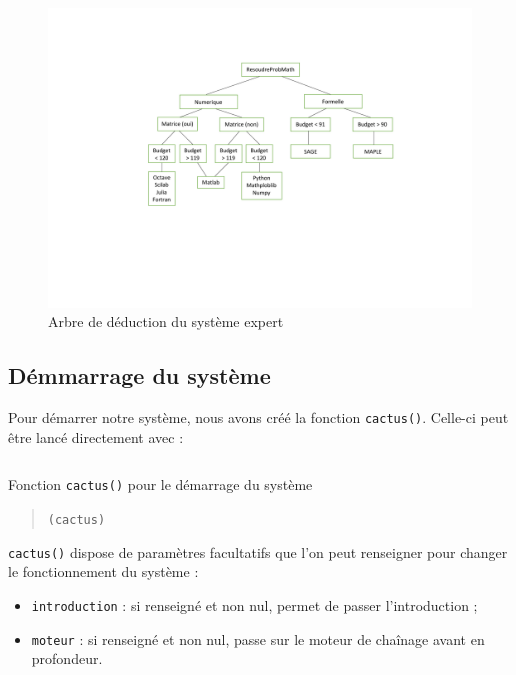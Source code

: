 \documentclass[a4paper,12pt]{article}
\begin{document}
	\begin{figure}[H]
		\centering
		\includegraphics[scale=0.5]{graph_deduction2.pdf}
		\caption{Arbre de déduction du système expert}
	\end{figure}

	\subsection{Démmarrage du système}
	
	Pour démarrer notre système, nous avons créé la fonction \texttt{cactus()}. Celle-ci peut être lancé directement avec :
	
\begin{listing}[H]
	\centering
	\inputminted[breaklines=true,linenos]{lisp}{../cactus.lisp}
	\caption{Fonction \texttt{cactus()} pour le démarrage du système}
\end{listing}

	
	\begin{quotation}
	\texttt{(cactus)}
	\end{quotation}

	\texttt{cactus()} dispose de paramètres facultatifs que l'on peut renseigner pour changer le fonctionnement du système :
	
	\begin{itemize}
		\item \texttt{introduction} : si renseigné et non nul, permet de passer l'introduction ;
		\item \texttt{moteur} : si renseigné et non nul, passe sur le moteur de chaînage avant en profondeur.
	\end{itemize}
	
\end{document}
